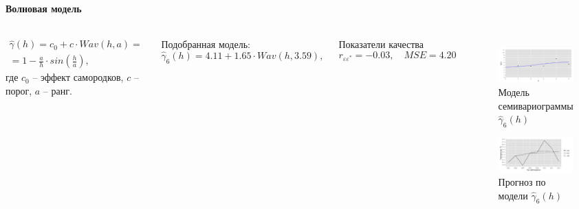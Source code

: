 \documentclass[notheorems]{beamer}
\theoremstyle{definition}
\theoremstyle{example}
\theoremstyle{plain}
\begin{document}
\begin{frame}
  \frametitle{\large\subsecname}
  \framesubtitle{Волновая модель}
  \begin{columns}[c]
  {\footnotesize
  \begin{eqnarray}
  \label{eq:wave}
    \widehat{\gamma}(h) = c_0 + c \cdot Wav(h, a) = \nonumber \\
    = 1 - \frac{a}{h} \cdot sin(\frac{h}{a}),
  \end{eqnarray}
  где $ c_0 $ -- эффект самородков, $ c $ -- порог, $ a $ -- ранг.

  \vspace{0.5em}

  Подобранная модель:
  \begin{equation}
  \label{eq:gamma9}
    \widehat{\gamma}_6(h) = 4.11 + 1.65 \cdot Wav(h, 3.59),
  \end{equation}

  Показатели качества
  \begin{equation*}
    r_{\varepsilon\varepsilon^{*}} = -0.03, \quad MSE = 4.20
  \end{equation*}
  }

  \vspace{-14.5pt}
  \begin{figure}[H]
    \includegraphics[width=0.9\linewidth]{../../figures/variogram/auto-rob-5-modeled.png} \\
    \caption{Модель семивариограммы $\widehat{\gamma}_6(h)$}
    \includegraphics[width=0.9\linewidth]{../../figures/variogram/auto-rob-5-cross-prediction.png}
    \caption{Прогноз по модели $\widehat{\gamma}_6(h)$}
  \end{figure}
  \end{columns}
\end{frame}
\end{document}
